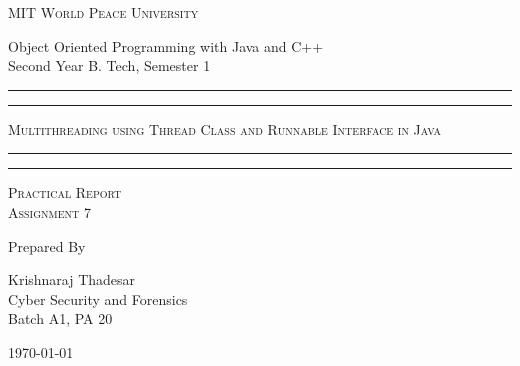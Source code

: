 \documentclass[11pt]{article}
\begin{document}
\begin{titlepage}
	\centering


	\huge\textsc{
		MIT World Peace University
	}\\

	\vspace{0.75\baselineskip} %

	\LARGE{
		Object Oriented Programming with Java and C++\\
		Second Year B. Tech, Semester 1
	}

	\vfill %


	\rule{\textwidth}{1.6pt}\vspace*{-\baselineskip}\vspace*{2pt}
	\rule{\textwidth}{0.6pt}
	\vspace{0.75\baselineskip} %



	\huge{\textsc{
			Multithreading using Thread Class and Runnable Interface in Java
		}} \\



	\vspace{0.5\baselineskip} %
	\rule{\textwidth}{0.6pt}\vspace*{-\baselineskip}\vspace*{2.8pt}
	\rule{\textwidth}{1.6pt}

	\vspace{1\baselineskip} %


	\LARGE\textsc{
		Practical Report\\
		Assignment 7
	} %
	\vfill


	Prepared By
	\vspace{0.5\baselineskip} %

	\Large{
		Krishnaraj Thadesar \\
		Cyber Security and Forensics\\
		Batch A1, PA 20
	}


	\vspace{0.5\baselineskip} %
	\today

\end{titlepage}
\end{document}
